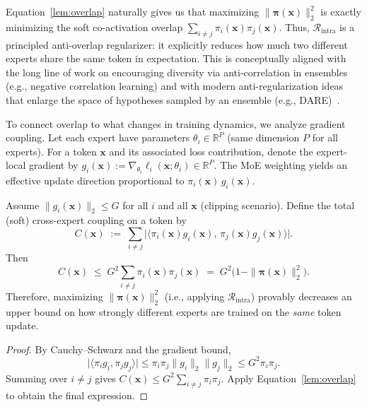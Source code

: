 \documentclass[sigconf,nonacm]{acmart}
\begin{document}
Equation~\eqref{lem:overlap} naturally gives us that maximizing $\|\bm{\pi}(\mathbf{x})\|_2^2$ is exactly
minimizing the soft co-activation overlap $\sum_{i\neq j}\pi_i(\mathbf{x})\pi_j(\mathbf{x})$.
Thus, $\mathcal{R}_{\text{intra}}$ is a principled anti-overlap regularizer:
it explicitly reduces how much two different experts share the same token in expectation.
This is conceptually aligned with the long line of work on encouraging diversity via anti-correlation in ensembles
(e.g., negative correlation learning) and with modern anti-regularization ideas that enlarge the space of hypotheses
sampled by an ensemble (e.g., DARE)~\citep{liu1999ensemble, antiregularization}.

To connect overlap to what changes in training dynamics, we analyze gradient coupling.
Let each expert have parameters $\theta_i\in\mathbb{R}^P$ (same dimension $P$ for all experts).
For a token $\mathbf{x}$ and its associated loss contribution, denote the expert-local gradient by
$g_i(\mathbf{x}) := \nabla_{\theta_i}\ell_i(\mathbf{x};\theta_i)\in\mathbb{R}^P$.
The MoE weighting yields an effective update direction proportional to
$\pi_i(\mathbf{x})\,g_i(\mathbf{x})$.

\begin{theorem}
\label{thm:grad-coupling}
Assume $\|g_i(\mathbf{x})\|_2 \le G$ for all $i$ and all $\mathbf{x}$ (clipping scenario).
Define the total (soft) cross-expert coupling on a token by
\[
C(\mathbf{x})
\;:=\;
\sum_{i\neq j}\bigl|\langle \pi_i(\mathbf{x})g_i(\mathbf{x}),\,\pi_j(\mathbf{x})g_j(\mathbf{x})\rangle\bigr|.
\]
Then
\[
C(\mathbf{x})
\;\le\;
G^2\sum_{i\neq j}\pi_i(\mathbf{x})\pi_j(\mathbf{x})
\;=\;
G^2\bigl(1-\|\bm{\pi}(\mathbf{x})\|_2^2\bigr).
\]
Therefore, maximizing $\|\bm{\pi}(\mathbf{x})\|_2^2$ (i.e., applying $\mathcal{R}_{\text{intra}}$)
provably decreases an upper bound on how strongly different experts are trained on the \emph{same} token update.
\end{theorem}

\begin{proof}
By Cauchy--Schwarz and the gradient bound,
\[
\bigl|\langle \pi_i g_i, \pi_j g_j\rangle\bigr|
\le \pi_i\pi_j\|g_i\|_2\|g_j\|_2
\le G^2\pi_i\pi_j.
\]
Summing over $i\neq j$ gives
$C(\mathbf{x})\le G^2\sum_{i\neq j}\pi_i\pi_j$.
Apply Equation~\eqref{lem:overlap} to obtain the final expression.
\end{proof}
\end{document}

